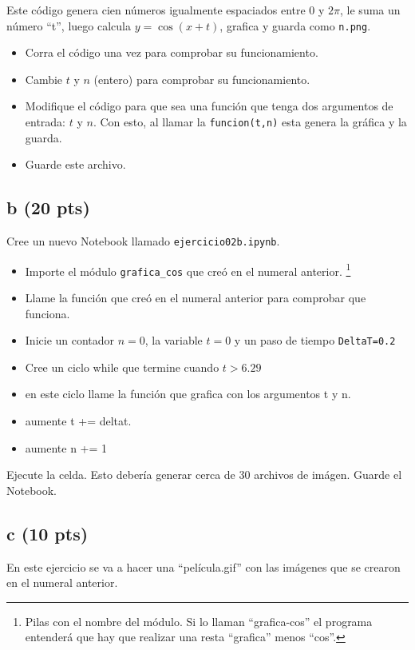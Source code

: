 \documentclass{article}
\begin{document}
Este código genera cien números igualmente espaciados entre 0 y $2 \pi$, le suma un número ``t'', luego calcula $y = \cos(x+t)$, grafica y guarda como \texttt{n.png}.

\begin{itemize}
    \item Corra el código una vez para comprobar su funcionamiento.
    \item Cambie $t$ y $n$ (entero) para comprobar su funcionamiento.
    \item Modifique el código para que sea una función que tenga dos argumentos de entrada: $t$ y $n$. Con esto, al llamar la \texttt{funcion(t,n)} esta genera la gráfica y la guarda.
    \item Guarde este archivo.
\end{itemize}

\subsection*{b (20 pts)}
Cree un nuevo Notebook llamado \texttt{ejercicio02b.ipynb}.

\begin{itemize}
    \item Importe el módulo \texttt{grafica\_cos} que creó en el numeral anterior. \footnote{Pilas con el nombre del módulo. Si lo llaman ``grafica-cos'' el programa entenderá que hay que realizar una resta ``grafica'' menos ``cos''. }
    \item Llame la función que creó en el numeral anterior para comprobar que funciona.
    \item Inicie un contador $n=0$, la variable $t=0$ y un paso de tiempo 
    \texttt{DeltaT=0.2}
    \item Cree un ciclo while que termine cuando $t >6.29$
    \item en este ciclo llame la función que grafica con los argumentos t y n.
    \item aumente t += deltat.
    \item aumente n += 1
\end{itemize}
 
Ejecute la celda. Esto debería generar cerca de 30 archivos de imágen. Guarde el Notebook.

\subsection*{c (10 pts)}

En este ejercicio se va a hacer una ``película.gif'' con las imágenes que se crearon en el numeral anterior.
\end{document}
